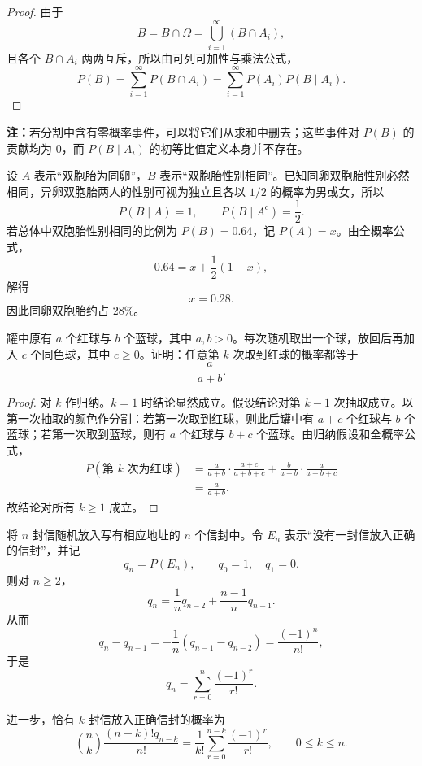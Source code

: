 \begin{proof}
由于
\[
B=B\cap\Omega
=\bigcup_{i=1}^{\infty}(B\cap A_i),
\]
且各个 $B\cap A_i$ 两两互斥，所以由可列可加性与乘法公式，
\[
P(B)=\sum_{i=1}^{\infty}P(B\cap A_i)
=\sum_{i=1}^{\infty}P(A_i)P(B\mid A_i).
\]
\end{proof}

\textbf{注：}\quad 若分割中含有零概率事件，可以将它们从求和中删去；这些事件对 $P(B)$ 的贡献均为 $0$，而 $P(B\mid A_i)$ 的初等比值定义本身并不存在。

\begin{example}[同卵双胞胎的比例]
设 $A$ 表示“双胞胎为同卵”，$B$ 表示“双胞胎性别相同”。已知同卵双胞胎性别必然相同，异卵双胞胎两人的性别可视为独立且各以 $1/2$ 的概率为男或女，所以
\[
P(B\mid A)=1,
\qquad
P(B\mid A^{\mathrm c})=\frac12.
\]
若总体中双胞胎性别相同的比例为 $P(B)=0.64$，记 $P(A)=x$。由全概率公式，
\[
0.64=x+\frac12(1-x),
\]
解得
\[
x=0.28.
\]
因此同卵双胞胎约占 $28\%$。
\end{example}

\begin{example}
罐中原有 $a$ 个红球与 $b$ 个蓝球，其中 $a,b>0$。每次随机取出一个球，放回后再加入 $c$ 个同色球，其中 $c\geq0$。证明：任意第 $k$ 次取到红球的概率都等于
\[
\frac{a}{a+b}.
\]
\end{example}

\begin{proof}
对 $k$ 作归纳。$k=1$ 时结论显然成立。假设结论对第 $k-1$ 次抽取成立。以第一次抽取的颜色作分割：若第一次取到红球，则此后罐中有 $a+c$ 个红球与 $b$ 个蓝球；若第一次取到蓝球，则有 $a$ 个红球与 $b+c$ 个蓝球。由归纳假设和全概率公式，
\[
\begin{aligned}
P(\text{第 $k$ 次为红球})
&=\frac{a}{a+b}\cdot\frac{a+c}{a+b+c}
+\frac{b}{a+b}\cdot\frac{a}{a+b+c}\\
&=\frac{a}{a+b}.
\end{aligned}
\]
故结论对所有 $k\geq1$ 成立。
\end{proof}

\begin{example}
将 $n$ 封信随机放入写有相应地址的 $n$ 个信封中。令 $E_n$ 表示“没有一封信放入正确的信封”，并记
\[
q_n=P(E_n),\qquad q_0=1,\quad q_1=0.
\]
则对 $n\geq2$，
\[
q_n=\frac1n q_{n-2}+\frac{n-1}{n}q_{n-1}.
\]
从而
\[
q_n-q_{n-1}=-\frac1n(q_{n-1}-q_{n-2})=\frac{(-1)^n}{n!},
\]
于是
\[
q_n=\sum_{r=0}^{n}\frac{(-1)^r}{r!}.
\]

进一步，恰有 $k$ 封信放入正确信封的概率为
\[
\binom{n}{k}\frac{(n-k)!q_{n-k}}{n!}
=\frac1{k!}\sum_{r=0}^{n-k}\frac{(-1)^r}{r!},
\qquad 0\leq k\leq n.
\]
\end{example}


